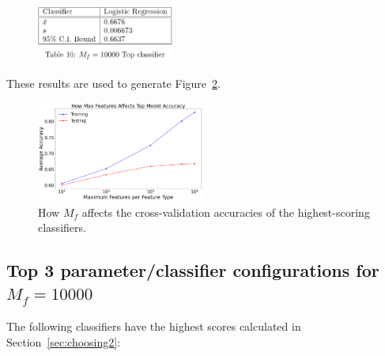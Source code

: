 \documentclass[11pt]{article}
\begin{document}

\begin{figure}[H]
	\centering
	\includegraphics[width = 0.4\textwidth]{mf10000.png}
	\label{tbl:mf10000}
\end{figure} 

These results are used to generate Figure~\ref{fig:accvsmf}.

\begin{figure}[H]
	\centering
	\includegraphics[width = 0.49\textwidth]{how-mf-varies-accuracies.png}
	\caption{How $M_f$ affects the cross-validation accuracies of the highest-scoring classifiers.}
	\label{fig:accvsmf}
\end{figure} 

\subsection{Top 3 parameter/classifier configurations for $M_f = 10000$}\label{sec:top3}

The following classifiers have the highest scores calculated in Section~\ref{sec:choosing2}:
\end{document}
